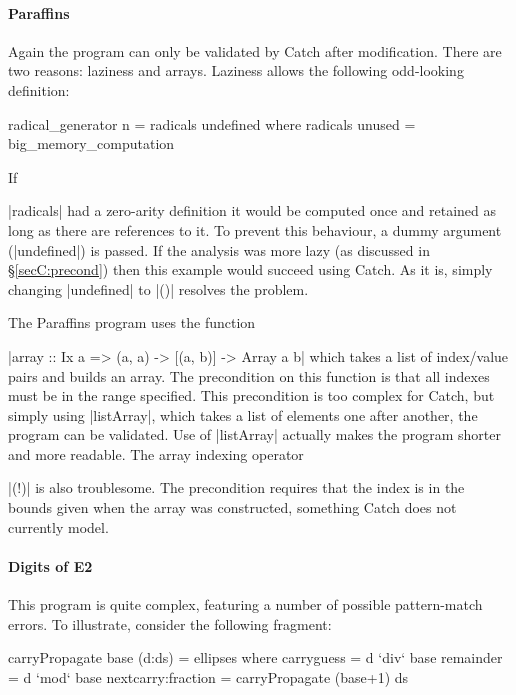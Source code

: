 \paragraph{Paraffins}

Again the program can only be validated by Catch after modification. There are two reasons: laziness and arrays. Laziness allows the following odd-looking definition:

\begin{comment}
\begin{code}
big_memory_computation = undefined
\end{code}
\end{comment}

\begin{code}
radical_generator n = radicals undefined
  where radicals unused = big_memory_computation
\end{code}

If \ignore|radicals| had a zero-arity definition it would be computed once and retained as long as there are references to it. To prevent this behaviour, a dummy argument (|undefined|) is passed. If the analysis was more lazy (as discussed in \S\ref{secC:precond}) then this example would succeed using Catch. As it is, simply changing |undefined| to |()| resolves the problem.

The Paraffins program uses the function \ignore|array :: Ix a => (a, a) -> [(a, b)] -> Array a b| which takes a list of index/value pairs and builds an array. The precondition on this function is that all indexes must be in the range specified. This precondition is too complex for Catch, but simply using |listArray|, which takes a list of elements one after another, the program can be validated. Use of |listArray| actually makes the program shorter and more readable. The array indexing operator \ignore|(!)| is also troublesome. The precondition requires that the index is in the bounds given when the array was constructed, something Catch does not currently model.


\paragraph{Digits of E2}

This program is quite complex, featuring a number of possible pattern-match errors. To illustrate, consider the following fragment:

\begin{code}
carryPropagate base (d:ds) = ellipses
  where  carryguess = d `div` base
         remainder = d `mod` base
         nextcarry:fraction = carryPropagate (base+1) ds
\end{code}

